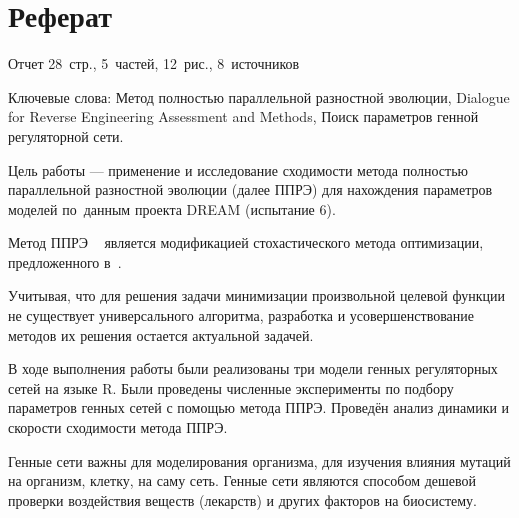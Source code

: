 \chapter*{Реферат}							%

Отчет 28~стр., 5~частей, 12~рис., 8~источников

Ключевые слова: Метод полностью параллельной разностной эволюции, Dialogue for 
Reverse Engineering Assessment and Methods, Поиск параметров генной регуляторной 
сети.

Цель работы — применение и исследование сходимости метода полностью параллельной
разностной эволюции (далее ППРЭ) для нахождения параметров моделей по~данным 
проекта DREAM (испытание 6).

Метод ППРЭ ~\cite{bib2,bib5} 
является модификацией стохастического метода оптимизации, предложенного 
в~\cite{bib1}. 

Учитывая, что для решения задачи минимизации произвольной целевой функции 
не существует универсального алгоритма, разработка и усовершенствование 
методов их решения остается актуальной задачей.

В ходе выполнения работы были реализованы три модели генных регуляторных сетей
на языке R. Были проведены численные эксперименты по подбору параметров генных
сетей с помощью метода ППРЭ. Проведён анализ динамики и скорости сходимости 
метода ППРЭ.

Генные сети важны для моделирования организма, для изучения влияния
мутаций на организм, клетку, на саму сеть. Генные сети являются способом дешевой
проверки воздействия веществ (лекарств) и других факторов на биосистему.

\clearpage
